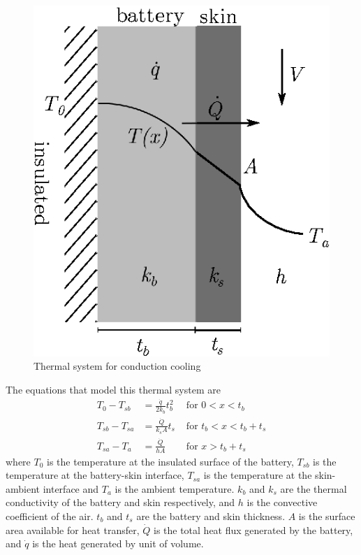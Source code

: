  \begin{figure}
     \centering
     \includegraphics{fig/conduction.eps}
     \caption{Thermal system for conduction cooling}
     \label{fig:conduction}
 \end{figure}
 
 The equations that model this thermal system are
 \begin{align}
   T_0-T_{sb} &= \frac{\dot{q}}{2k_b}t_b^2 &\text{ for } 0 < x <t_b \\
   T_{sb}-T_{sa} &= \frac{\dot{Q}}{k_s A} t_s &\text{ for } t_b<x<t_b+t_s\\
   T_{sa} - T_a &= \frac{\dot{Q}}{hA} &\text{ for } x>t_b+t_s
 \end{align}
 where $T_0$ is the temperature at the insulated surface of the battery, $T_{sb}$ is the temperature at the battery-skin interface, $T_{sa}$ is the temperature at the skin-ambient interface and $T_a$ is the ambient temperature. $k_b$ and $k_s$ are the thermal conductivity of the battery and skin respectively, and $h$ is the convective coefficient of the air. $t_b$ and $t_s$ are the battery and skin thickness. $A$ is the surface area available for heat transfer, $\dot{Q}$ is the total heat flux generated by the battery, and $\dot{q}$ is the heat generated by unit of volume.
 
